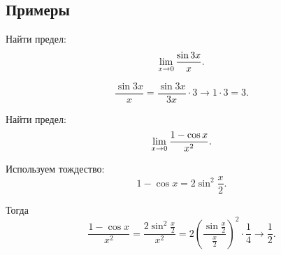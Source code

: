 \subsection{Примеры}

\begin{example}
Найти предел:
\[
\lim\limits_{x \to 0}\frac{\sin 3x}{x}.
\]

\[
\frac{\sin 3x}{x}
=
\frac{\sin 3x}{3x}\cdot 3
\to 1\cdot 3=3.
\]
\end{example}

\begin{example}
Найти предел:
\[
\lim\limits_{x \to 0}\frac{1-\cos x}{x^2}.
\]

Используем тождество:
\[
1-\cos x = 2\sin^2\frac{x}{2}.
\]

Тогда
\[
\frac{1-\cos x}{x^2}
=
\frac{2\sin^2\frac{x}{2}}{x^2}
=
2\left(\frac{\sin\frac{x}{2}}{\frac{x}{2}}\right)^2
\cdot
\frac{1}{4}
\to
\frac12.
\]
\end{example}
